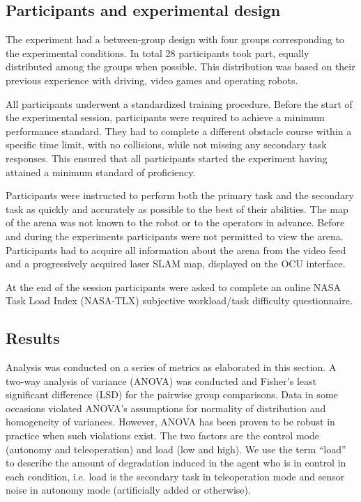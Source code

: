 \documentclass[a4paper,12pt,oneside,openright]{bhamthesis}
\begin{document}
\subsection{Participants and experimental design}

The experiment had a between-group design with four groups corresponding to the experimental conditions. In total 28 participants took part, equally distributed among the groups when possible. This distribution was based on their previous experience with driving, video games and operating robots. 

All participants underwent a standardized training procedure. Before the start of the experimental session, participants were required to achieve a minimum performance standard. They had to complete a different obstacle course within a specific time limit, with no collisions, while not missing any secondary task responses. This ensured that all participants started the experiment having attained a minimum standard of proficiency.

Participants were instructed to perform both the primary task and the secondary task as quickly and accurately as possible to the best of their abilities. The map of the arena was not known to the robot or to the operators in advance. Before and during the experiments participants were not permitted to view the arena. Participants had to acquire all information about the arena from the video feed and a progressively acquired laser SLAM map, displayed on the OCU interface.

At the end of the session participants were asked to complete an online NASA Task Load Index (NASA-TLX) \citep{Sharek2011} subjective workload/task difficulty questionnaire.

\subsection{Results}

Analysis was conducted on a series of metrics as elaborated in this section. A two-way analysis of variance (ANOVA) was conducted and Fisher's least significant difference (LSD) for the pairwise group comparisons. Data in some occasions violated ANOVA's assumptions for normality of distribution and homogeneity of variances. However, ANOVA has been proven to be robust in practice when such violations exist. The two factors are the control mode (autonomy and teleoperation) and load (low and high). We use the term ``load'' to describe the amount of degradation induced in the agent who is in control in each condition, i.e. load is the secondary task in teleoperation mode and sensor noise in autonomy mode (artificially added or otherwise). 
\end{document}
